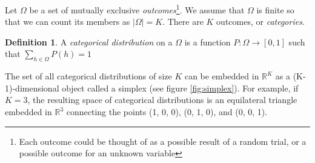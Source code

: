 \documentclass[twoside]{article}
\theoremstyle{plain}%
\theoremstyle{definition}
\newtheorem{definition}{Definition}[section]
\theoremstyle{remark}
\begin{document}
Let \(\Omega\) be a set of mutually exclusive \textit{outcomes}\footnote{Each outcome could be thought of as a possible result of a random trial, or a possible outcome for an unknown variable}. We assume that \(\Omega\) is finite so that we can count its members as \(|\Omega| = K\). There are \(K\) outcomes, or \textit{categories}.

\begin{definition}
\label{def:categorical_abs}
A \textit{categorical distribution} on a \(\Omega\) is a function \(P: \Omega \rightarrow [0, 1]\) such that \(\sum_{h \in \Omega} P(h) = 1\)
\end{definition}

The set of all categorical distributions of size \(K\) can be embedded in \(\mathbb{R}^K\) as a (K-1)-dimensional object called a simplex (see figure \ref{fig:simplex}). For example, if \(K = 3\), the resulting space of categorical distributions is an equilateral triangle embedded in \(\mathbb{R}^3\) connecting the points (1, 0, 0), (0, 1, 0), and (0, 0, 1).
\end{document}
